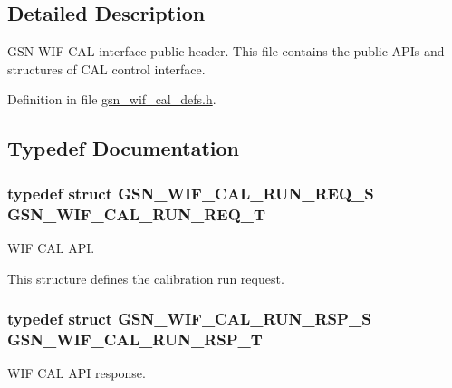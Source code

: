 \subsection{Detailed Description}
GSN WIF CAL interface public header. This file contains the public APIs and structures of CAL control interface. 

Definition in file \hyperlink{a00607_source}{gsn\_\-wif\_\-cal\_\-defs.h}.



\subsection{Typedef Documentation}
\hypertarget{a00607_a8a9394dbece8b33318df662ac02fcbc5}{
\subsubsection[{GSN\_\-WIF\_\-CAL\_\-RUN\_\-REQ\_\-T}]{\setlength{\rightskip}{0pt plus 5cm}typedef struct {\bf GSN\_\-WIF\_\-CAL\_\-RUN\_\-REQ\_\-S}  {\bf GSN\_\-WIF\_\-CAL\_\-RUN\_\-REQ\_\-T}}}
\label{a00607_a8a9394dbece8b33318df662ac02fcbc5}


WIF CAL API. 

This structure defines the calibration run request. \hypertarget{a00607_aa8ebea34fbddec643c0faa7d5f58319e}{
\subsubsection[{GSN\_\-WIF\_\-CAL\_\-RUN\_\-RSP\_\-T}]{\setlength{\rightskip}{0pt plus 5cm}typedef struct {\bf GSN\_\-WIF\_\-CAL\_\-RUN\_\-RSP\_\-S}  {\bf GSN\_\-WIF\_\-CAL\_\-RUN\_\-RSP\_\-T}}}
\label{a00607_aa8ebea34fbddec643c0faa7d5f58319e}


WIF CAL API response. 

